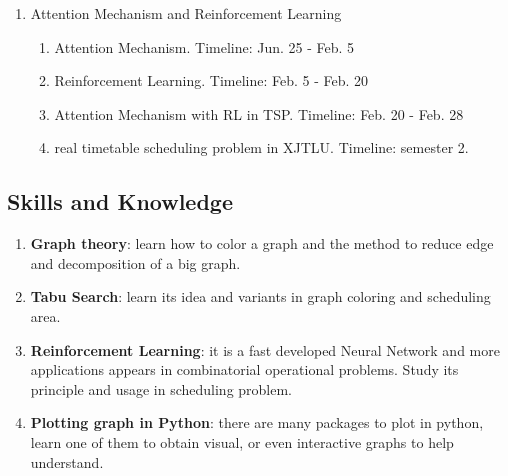 \documentclass{article}
\begin{document}
\begin{itemize}
\begin{enumerate}
\begin{enumerate}
		            \end{enumerate}
		      \item Attention Mechanism and Reinforcement Learning
		            \begin{enumerate}
			            \item Attention Mechanism. Timeline: Jun. 25 - Feb. 5
			            \item Reinforcement Learning. Timeline: Feb. 5 - Feb. 20
			            \item Attention Mechanism with RL in TSP. Timeline: Feb. 20 - Feb. 28
			            \item real timetable scheduling problem in XJTLU. Timeline: semester 2.
		            \end{enumerate}
	      \end{enumerate}
\end{itemize}

\subsection{Skills and Knowledge}
\begin{enumerate}
	\item \textbf{Graph theory}: learn how to color a graph and the method to reduce edge and decomposition of a big graph.
	\item \textbf{Tabu Search}: learn its idea and variants in graph coloring and scheduling area.
	\item \textbf{Reinforcement Learning}: it is a fast developed Neural Network and more applications appears in combinatorial operational problems. Study its principle and usage in scheduling problem.
	\item \textbf{Plotting graph in Python}: there are many packages to plot in python, learn one of them to obtain visual, or even interactive graphs to help understand.
\end{enumerate}
\end{document}
